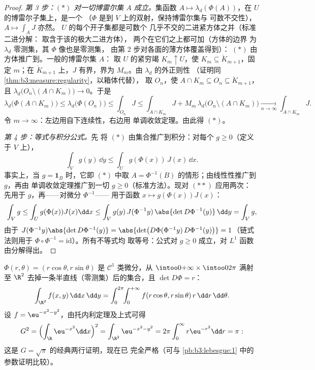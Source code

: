 \begin{proof}
\emph{第 3 步：$(*)$ 对一切博雷尔集 $A$ 成立。}集函数 $A
\mapsto \lambda_d(\Phi(A))$，在 $U$ 的博雷尔子集上，是一个
（$\Phi$ 是到 $V$ 上的双射，保持博雷尔集与
可数不交性），$A \mapsto \int_AJ$ 亦然。
$U$ 的每个开子集都是可数个
几乎不交的二进紧方体之并（标准二进分解：
取含于该的极大二进方体），
两个在它们之上都可加（方体的边界
为 $\lambda_d$ 零测集，其 $\Phi$ 像也是零测集，
由第 2 步对各面的薄方体覆盖得到）：
$(*)$ 由方体推广到。一般的博雷尔集 $A$：
取 $U$ 的紧穷竭 $K_m \uparrow U$，使 $K_m \subseteq
\mathring K_{m+1}$，固定 $m$；在 $\mathring K_{m+1}$ 上，$J$
有界，界为 $M_m$。由 $\lambda_d$ 的外正则性
（证明同\cref{thm:b3:measure:regularity}，以箱体代替），
取 $O_n$，使 $A \cap K_m \subseteq O_n
\subseteq \mathring K_{m+1}$，且 $\lambda_d\bigl(O_n \setminus
(A\cap K_m)\bigr) \to 0$。于是
\[
\lambda_d\bigl(\Phi(A\cap K_m)\bigr) \leq
\lambda_d\bigl(\Phi(O_n)\bigr) \leq \int_{O_n}J
\leq \int_{A\cap K_m}J + M_m\,\lambda_d\bigl(O_n\setminus(A\cap
K_m)\bigr) \xrightarrow[n\to\infty]{} \int_{A\cap K_m}J .
\]
令 $m \to \infty$：左边用自下连续性，右边用
单调收敛定理。由此得 $(*)$。

\emph{第 4 步：等式与积分公式。}先
将 $(*)$ 由集合推广到积分：对每个 $g
\geq 0$（定义于 $V$ 上），
\[
\int_V g(y)\,\dd y \leq \int_U g(\Phi(x))\,J(x)\,\dd x .
\tag{$**$}
\]
事实上，当 $g = \mathbf 1_B$ 时，它即 $(*)$ 中取 $A =
\Phi^{-1}(B)$ 的情形；由线性性推广到 $g$，再由
单调收敛定理推广到一切 $g \geq 0$（标准方法）。现对 $(**)$ 应用两次：
先用于 $g$，再——对微分 $\Phi^{-1}$——
用于函数 $x \mapsto g(\Phi(x))J(x)$：
\[
\int_Vg \leq \int_U g(\Phi(x))J(x)\dd x
\leq \int_V g(y)\,J(\Phi^{-1}y)\,\abs{\det
D\Phi^{-1}(y)}\,\dd y = \int_V g ,
\]
由于 $J(\Phi^{-1}y)\abs{\det D\Phi^{-1}(y)} = \abs{\det\bigl(
D\Phi(\Phi^{-1}y)\,D\Phi^{-1}(y)\bigr)} = 1$（链式法则用于
$\Phi\circ\Phi^{-1} = \mathrm{id}$）。所有不等式均
取等号：公式对 $g \geq 0$ 成立，对 $L^1$
函数由分解得出。
\end{proof}

\begin{example}
\label{ex:b3:product:polar}
$\Phi(r, \theta) = (r\cos\theta, r\sin\theta)$ 是 $\mathcal
C^1$ 类微分，从 $\intoo0{+\infty}\times\intoo0{2\pi}$
满射至 $\R^2$ 去掉一条半直线（零测集）后的集合，且 $\det D\Phi =
r$：
\[
\int_{\R^2}f(x, y)\,\dd x\,\dd y
= \int_0^{2\pi}\!\!\int_0^{+\infty}
f(r\cos\theta, r\sin\theta)\,r\,\dd r\,\dd\theta .
\]
设 $f = \eu^{-x^2-y^2}$，由托内利定理及上式可得
\[
G^2 = \Bigl(\int_\R \eu^{-x^2}\dd x\Bigr)^2
= \int_{\R^2}\eu^{-x^2-y^2}
= 2\pi\int_0^\infty r\eu^{-r^2}\dd r = \pi:
\]
这是 $G = \sqrt\pi$ 的经典两行证明，现在已
完全严格（可与
\cref{pb:b3:lebesgue:1} 中的参数证明比较）。
\end{example}

